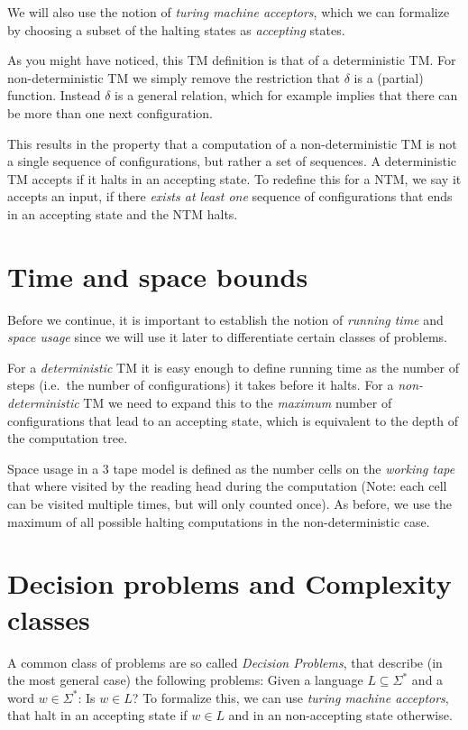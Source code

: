 We will also use the notion of \emph{turing machine acceptors}, which we
can formalize by choosing a subset of the halting states as
\emph{accepting} states.

As you might have noticed, this TM definition is that of a deterministic
TM. For non-deterministic TM we simply remove the restriction that
$\delta$ is a (partial) function. Instead $\delta$ is a general
relation, which for example implies that there can be more than one next
configuration.

This results in the property that a computation of a non-deterministic
TM is not a single sequence of configurations, but rather a set of
sequences. A deterministic TM accepts if it halts in an accepting state.
To redefine this for a NTM, we say it accepts an input, if there
\emph{exists at least one} sequence of configurations that ends in an
accepting state and the NTM halts.

\section{Time and space bounds}\label{time-and-space-bounds}

Before we continue, it is important to establish the notion of
\emph{running time} and \emph{space usage} since we will use it later to
differentiate certain classes of problems.

For a \emph{deterministic} TM it is easy enough to define running time
as the number of steps (i.e.~the number of configurations) it takes
before it halts. For a \emph{non-deterministic} TM we need to expand
this to the \emph{maximum} number of configurations that lead to an
accepting state, which is equivalent to the depth of the computation
tree.

Space usage in a 3 tape model is defined as the number cells on the
\emph{working tape} that where visited by the reading head during the
computation (Note: each cell can be visited multiple times, but will
only counted once). As before, we use the maximum of all possible
halting computations in the non-deterministic case.

\section{Decision problems and Complexity
classes}\label{decision-problems-and-complexity-classes}

A common class of problems are so called \emph{Decision Problems}, that
describe (in the most general case) the following problems: Given a
language $L \subseteq \Sigma^*$ and a word $w \in \Sigma^*$: Is
$w \in L$? To formalize this, we can use \emph{turing machine
acceptors}, that halt in an accepting state if $w \in L$ and in an
non-accepting state otherwise.

